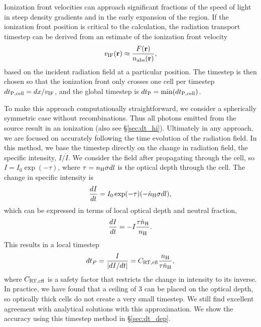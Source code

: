 \documentclass[apj,onecolumn]{emulateapj}
\begin{document}
Ionization front velocities can approach significant fractions of the
speed of light in steep density gradients and in the early expansion
of the  region.  If the ionization front position is
critical to the calculation, the radiation transport timestep can be
derived from an estimate of the ionization front velocity
%
\begin{equation}
  \label{eqn:dt_incident}
  v_{\rm IF}(\mathbf{r}) \approx \frac{F(\mathbf{r})}
  {n_{\rm abs}(\mathbf{r})},
\end{equation}
%
based on the incident radiation field at a particular position.  The
timestep is then chosen so that the ionization front only crosses one
cell per timestep $dt_{\rm P, cell} = dx / v_{\rm IF}$, and the global
timestep is $dt_{\rm P} = \min(dt_{\rm P, cell})$.  

To make this approach computationally straightforward, we consider a
spherically symmetric case without recombinations.  Thus all photons
emitted from the source result in an ionization (also see
\S\ref{sec:dt_hi}).  Ultimately in any approach, we are focused on
accurately following the time evolution of the radiation field.  In
this method, we base the timestep directly on the change in radiation
field, the specific intensity, $I/\dot{I}$.  We consider the field
after propagating through the cell, so $I = I_0 \exp(-\tau)$, where
$\tau = n_{\rm H} \sigma dl$ is the optical depth through the cell.
The change in specific intensity is
%
\begin{equation}
  \label{eqn:vifront2}
    \frac{dI}{dt} = I_0 \exp(-\tau) (-\dot{n}_{\rm H} \sigma dl),
\end{equation}
%
which can be expressed in terms of local optical depth and neutral
fraction,
\begin{equation}
  \label{eqn:vifront3}
    \frac{dI}{dt} = -I \frac{\tau \dot{n}_{\rm H}}{n_{\rm H}}.
\end{equation}
%
This results in a local timestep
%
\begin{equation}
  \label{eqn:vifront4}
  dt_P = \frac{I}{|dI/dt|} = C_{\rm RT,cfl} \frac{n_{\rm H}}{\tau \dot{n}_{\rm H}},
\end{equation}
%
where $C_{\rm RT,cfl}$ is a safety factor that restricts the change in
intensity to its inverse.  In practice, we have found that a ceiling
of 3 can be placed on the optical depth, so optically thick cells do
not create a very small timestep.  We still find excellent agreement
with analytical solutions with this approximation.  We show the
accuracy using this timestep method in \S\ref{sec:dt_dep}.
\end{document}
